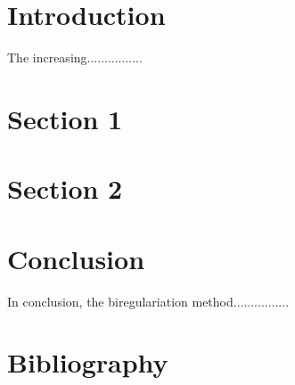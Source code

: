 \documentclass{article}
\begin{document}
\begin{titlepage}
	
	\vfill 
\end{titlepage}

\tableofcontents


\section*{Introduction}

The increasing................



\section{Section 1}




\section{Section 2}


\section*{Conclusion}

In conclusion, the biregulariation method................



\section{Bibliography}
\nocite{*}
\printbibliography
\end{document}

